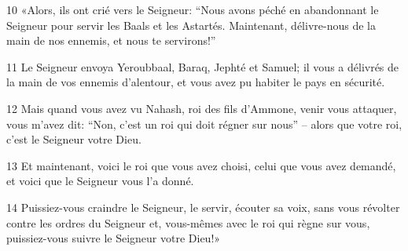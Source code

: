 
10 «Alors, ils ont crié vers le Seigneur: “Nous avons péché en abandonnant le Seigneur pour servir les Baals et les Astartés. Maintenant, délivre-nous de la main de nos ennemis, et nous te servirons!”

11 Le Seigneur envoya Yeroubbaal, Baraq, Jephté et Samuel; il vous a délivrés de la main de vos ennemis d’alentour, et vous avez pu habiter le pays en sécurité.

12 Mais quand vous avez vu Nahash, roi des fils d’Ammone, venir vous attaquer, vous m’avez dit: “Non, c’est un roi qui doit régner sur nous” – alors que votre roi, c’est le Seigneur votre Dieu.

13 Et maintenant, voici le roi que vous avez choisi, celui que vous avez demandé, et voici que le Seigneur vous l’a donné.

14 Puissiez-vous craindre le Seigneur, le servir, écouter sa voix, sans vous révolter contre les ordres du Seigneur et, vous-mêmes avec le roi qui règne sur vous, puissiez-vous suivre le Seigneur votre Dieu!»